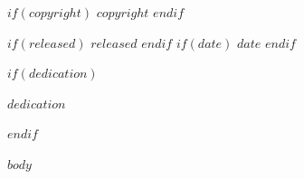 \documentclass[11pt,fleqn]{book} %
\makeatletter
\renewcommand{\cleardoublepage}{
\clearpage\ifodd\c@page\else
\hbox{}
\vspace*{\fill}
\thispagestyle{empty}
\newpage
\fi}
\newif\ifusechapterimage
\newcommand{\thechapterimage}{}%
\newcommand{\chapterimage}[1]{\ifusechapterimage\renewcommand{\thechapterimage}{#1}\fi}%
\makeatother
\begin{document}

$if(copyright)$
\noindent $copyright$
$endif$

$if(released)$
\noindent \textit{$released$}
$endif$
$if(date)$
\textit{$date$}
$endif$


\newenvironment{dedication}
    {\vspace{6ex}\hspace*{\fill}\begin{em}}
    {\par\end{em}}

$if(dedication)$
\newpage
~\vfill
\thispagestyle{empty}

\begin{dedication}
$dedication$
\end{dedication}
$endif$



\chapterimage{chapter-head-1.pdf} %

\pagestyle{empty} %

\tableofcontents %

\cleardoublepage %

\pagestyle{fancy} %





$body$

\end{document}
